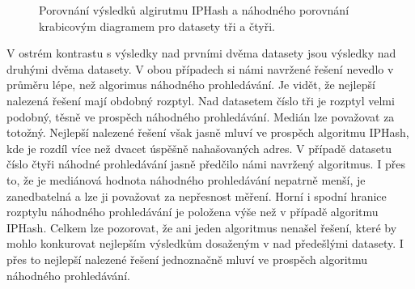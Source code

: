 \begin{figure}[!h]
\centering
{}
	\caption{Porovnání výsledků algirutmu IPHash a náhodného porovnání krabicovým diagramem pro datasety tři a čtyři.}
	\label{fig:basic_boxplot_2}
\end{figure}

V ostrém kontrastu s výsledky nad prvními dvěma datasety jsou výsledky nad druhými dvěma datasety. V obou případech
si námi navržené řešení nevedlo v průměru lépe, než algorimus náhodného prohledávání. Je vidět, že nejlepší
nalezená řešení mají obdobný rozptyl. Nad datasetem číslo tři je rozptyl velmi podobný, těsně ve prospěch 
náhodného prohledávání. Medián lze považovat za totožný. Nejlepší nalezené řešení však jasně mluví ve prospěch
algoritmu IPHash, kde je rozdíl více než dvacet úspěšně nahašovaných adres. V případě datasetu číslo čtyři náhodné
prohledávání jasně předčilo námi navržený algoritmus. I přes to, že je mediánová hodnota náhodného prohledávání
nepatrně menší, je zanedbatelná a lze ji považovat za nepřesnost měření. Horní i spodní hranice rozptylu náhodného
prohledávání je položena výše než v případě algoritmu IPHash. Celkem lze pozorovat, že ani jeden algoritmus 
nenašel řešení, které by mohlo konkurovat nejlepším výsledkům dosaženým v nad předešlými datasety. I přes to
nejlepší nalezené řešení jednoznačně mluví ve prospěch algoritmu náhodného prohledávání.


